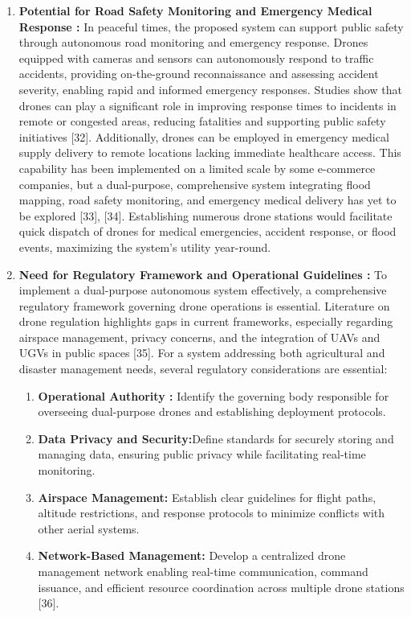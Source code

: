 \documentclass[conference]{IEEEtran}
\begin{document}
\begin{enumerate}
	
	\item \textbf{Potential for Road Safety Monitoring and Emergency Medical Response : }
	In peaceful times, the proposed system can support public safety through autonomous road monitoring and emergency response. Drones equipped with cameras and sensors can autonomously respond to traffic accidents, providing on-the-ground reconnaissance and assessing accident severity, enabling rapid and informed emergency responses. Studies show that drones can play a significant role in improving response times to incidents in remote or congested areas, reducing fatalities and supporting public safety initiatives [32]. Additionally, drones can be employed in emergency medical supply delivery to remote locations lacking immediate healthcare access. This capability has been implemented on a limited scale by some e-commerce companies, but a dual-purpose, comprehensive system integrating flood mapping, road safety monitoring, and emergency medical delivery has yet to be explored [33], [34]. Establishing numerous drone stations would facilitate quick dispatch of drones for medical emergencies, accident response, or flood events, maximizing the system’s utility year-round.
	
	
	\item \textbf{Need for Regulatory Framework and Operational Guidelines : }
	To implement a dual-purpose autonomous system effectively, a comprehensive regulatory framework governing drone operations is essential. Literature on drone regulation highlights gaps in current frameworks, especially regarding airspace management, privacy concerns, and the integration of UAVs and UGVs in public spaces [35]. For a system addressing both agricultural and disaster management needs, several regulatory considerations are essential:
	\begin{enumerate}
		\item \textbf{Operational Authority : } Identify the governing body responsible for overseeing dual-purpose drones and establishing deployment protocols.
		\item \textbf{Data Privacy and Security:}Define standards for securely storing and managing data, ensuring public privacy while facilitating real-time monitoring.
		\item \textbf{Airspace Management:} Establish clear guidelines for flight paths, altitude restrictions, and response protocols to minimize conflicts with other aerial systems.
		\item \textbf{Network-Based Management:} Develop a centralized drone management network enabling real-time communication, command issuance, and efficient resource coordination across multiple drone stations [36].
	\end{enumerate}
\end{enumerate}
\end{document}
